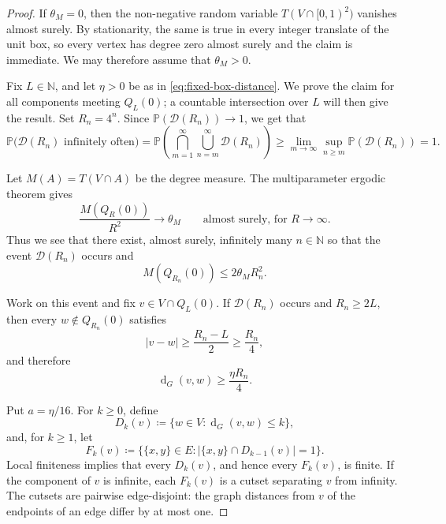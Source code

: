 \documentclass[10pt,a4paper]{amsart}
\newcommand{\N}{\mathbb{N}}
\renewcommand{\P}{\mathbb{P}}
\newcommand{\dG}{\operatorname{d}_{G}}
\begin{document}
\begin{proof}
If \(\theta_M=0\), then the non-negative random variable
\(T(V\cap[0,1)^2)\) vanishes almost surely. By stationarity, the same is true
in every integer translate of the unit box, so every vertex has degree zero
almost surely and the claim is immediate. We may therefore assume that
\(\theta_M>0\).

Fix \(L\in\N\), and let \(\eta>0\) be as in
\eqref{eq:fixed-box-distance}. We prove the claim for all components meeting
\(Q_L(0)\); a countable intersection over \(L\) will then give the result.
Set \(R_n=4^n\).  Since
\(\P(\mathcal D(R_n))\to1\), we get that
\[
  \P\big(\mathcal D(R_n)\text{ infinitely often}\big) = \P\left( \bigcap_{m=1}^{\infty} \bigcup_{n= m}^{\infty} \mathcal D(R_n)\right)
  \geq 
  \lim_{m\to \infty} \sup_{n \geq m}
  \P\left( \mathcal D(R_n)\right)=1.
\]

Let \(M(A)=T(V\cap A)\) be the degree measure.  The multiparameter ergodic
theorem gives
\[
  \frac{M(Q_R(0))}{R^2}\longrightarrow\theta_M
  \qquad\text{almost surely, for } R\to \infty.
\]
Thus we see that there exist, almost surely, infinitely many $n \in \N$ so that
the event \(\mathcal D(R_n)\) occurs and
\begin{equation}
\label{eq:direct-degree-volume}
  M(Q_{R_n}(0))\le 2 \theta_M R_n^2.
\end{equation}


Work on this event and fix \(v\in V\cap Q_L(0)\). If \(\mathcal D(R_n)\)
occurs and \(R_n\ge2L\), then every
\(w\notin Q_{R_n}(0)\) satisfies
\[
  |v-w|
  \ge \frac{R_n-L}{2}
  \ge \frac{R_n}{4},
\]
and therefore
\begin{equation}
\label{eq:direct-distance-outside}
  \dG(v,w)\ge\frac{\eta R_n}{4}.
\end{equation}

Put \(a=\eta/16\).  For \(k\ge0\), define
\[
  D_k(v) \coloneqq \{w\in V:\dG(v,w)\le k\},
\]
and, for \(k\ge1\), let
\[
  F_k(v) \coloneqq
  \big\{\{x,y\}\in E:|\{x,y\}\cap D_{k-1}(v)|=1\big\}.
\]
Local finiteness implies that every \(D_k(v)\), and hence every \(F_k(v)\),
is finite.  If the component of \(v\) is infinite, each \(F_k(v)\) is a cutset
separating \(v\) from infinity.  The cutsets are pairwise edge-disjoint: the
graph distances from \(v\) of the endpoints of an edge differ by at most one.


\end{proof}
\end{document}

